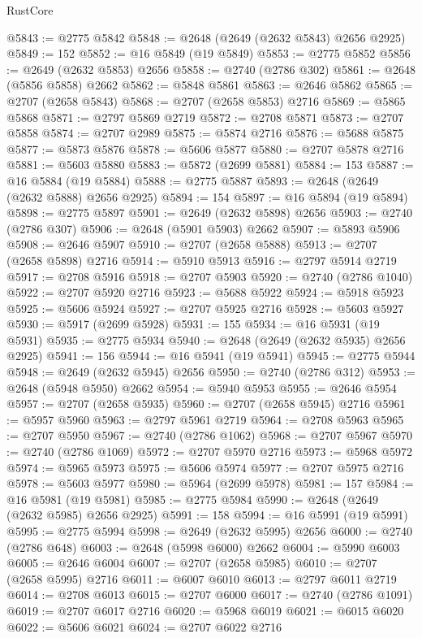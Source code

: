 \begin{lexlean}{RustCore}
\begin{coremodule}
@5843 := @2775 @5842
@5848 := @2648 (@2649 (@2632 @5843) @2656 @2925)
@5849 := 152
@5852 := @16 @5849 (@19 @5849)
@5853 := @2775 @5852
@5856 := @2649 (@2632 @5853) @2656
@5858 := @2740 (@2786 @302)
@5861 := @2648 (@5856 @5858) @2662
@5862 := @5848 @5861
@5863 := @2646 @5862
@5865 := @2707 (@2658 @5843)
@5868 := @2707 (@2658 @5853) @2716
@5869 := @5865 @5868
@5871 := @2797 @5869 @2719
@5872 := @2708 @5871
@5873 := @2707 @5858
@5874 := @2707 @2989
@5875 := @5874 @2716
@5876 := @5688 @5875
@5877 := @5873 @5876
@5878 := @5606 @5877
@5880 := @2707 @5878 @2716
@5881 := @5603 @5880
@5883 := @5872 (@2699 @5881)
@5884 := 153
@5887 := @16 @5884 (@19 @5884)
@5888 := @2775 @5887
@5893 := @2648 (@2649 (@2632 @5888) @2656 @2925)
@5894 := 154
@5897 := @16 @5894 (@19 @5894)
@5898 := @2775 @5897
@5901 := @2649 (@2632 @5898) @2656
@5903 := @2740 (@2786 @307)
@5906 := @2648 (@5901 @5903) @2662
@5907 := @5893 @5906
@5908 := @2646 @5907
@5910 := @2707 (@2658 @5888)
@5913 := @2707 (@2658 @5898) @2716
@5914 := @5910 @5913
@5916 := @2797 @5914 @2719
@5917 := @2708 @5916
@5918 := @2707 @5903
@5920 := @2740 (@2786 @1040)
@5922 := @2707 @5920 @2716
@5923 := @5688 @5922
@5924 := @5918 @5923
@5925 := @5606 @5924
@5927 := @2707 @5925 @2716
@5928 := @5603 @5927
@5930 := @5917 (@2699 @5928)
@5931 := 155
@5934 := @16 @5931 (@19 @5931)
@5935 := @2775 @5934
@5940 := @2648 (@2649 (@2632 @5935) @2656 @2925)
@5941 := 156
@5944 := @16 @5941 (@19 @5941)
@5945 := @2775 @5944
@5948 := @2649 (@2632 @5945) @2656
@5950 := @2740 (@2786 @312)
@5953 := @2648 (@5948 @5950) @2662
@5954 := @5940 @5953
@5955 := @2646 @5954
@5957 := @2707 (@2658 @5935)
@5960 := @2707 (@2658 @5945) @2716
@5961 := @5957 @5960
@5963 := @2797 @5961 @2719
@5964 := @2708 @5963
@5965 := @2707 @5950
@5967 := @2740 (@2786 @1062)
@5968 := @2707 @5967
@5970 := @2740 (@2786 @1069)
@5972 := @2707 @5970 @2716
@5973 := @5968 @5972
@5974 := @5965 @5973
@5975 := @5606 @5974
@5977 := @2707 @5975 @2716
@5978 := @5603 @5977
@5980 := @5964 (@2699 @5978)
@5981 := 157
@5984 := @16 @5981 (@19 @5981)
@5985 := @2775 @5984
@5990 := @2648 (@2649 (@2632 @5985) @2656 @2925)
@5991 := 158
@5994 := @16 @5991 (@19 @5991)
@5995 := @2775 @5994
@5998 := @2649 (@2632 @5995) @2656
@6000 := @2740 (@2786 @648)
@6003 := @2648 (@5998 @6000) @2662
@6004 := @5990 @6003
@6005 := @2646 @6004
@6007 := @2707 (@2658 @5985)
@6010 := @2707 (@2658 @5995) @2716
@6011 := @6007 @6010
@6013 := @2797 @6011 @2719
@6014 := @2708 @6013
@6015 := @2707 @6000
@6017 := @2740 (@2786 @1091)
@6019 := @2707 @6017 @2716
@6020 := @5968 @6019
@6021 := @6015 @6020
@6022 := @5606 @6021
@6024 := @2707 @6022 @2716

\end{coremodule}
\end{lexlean}
